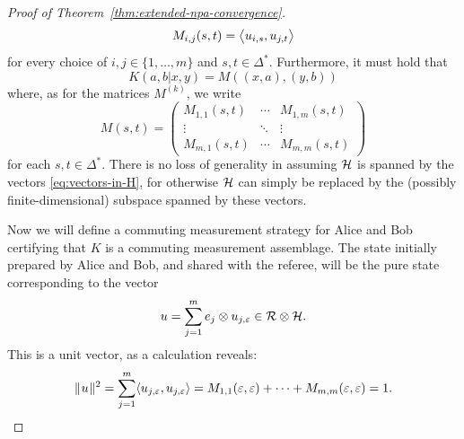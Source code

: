 \begin{proof}[Proof of Theorem~\ref{thm:extended-npa-convergence}]
  \begin{equation}
    M_{i,j}(s,t) = \bigl\langle u_{i,s}, u_{j,t} \bigr\rangle
  \end{equation}
  for every choice of $i,j\in\{1,\ldots,m\}$ and $s,t\in\Delta^{\ast}$.
  Furthermore, it must hold that
  \begin{equation}
    K(a,b|x,y) = M((x,a),(y,b))
  \end{equation}
  where, as for the matrices $M^{(k)}$, we write
  \begin{equation}
    M(s,t) = 
    \begin{pmatrix}
      M_{1,1}(s,t) & \cdots & M_{1,m}(s,t)\\
      \vdots & \ddots & \vdots\\
      M_{m,1}(s,t) & \cdots & M_{m,m}(s,t)
    \end{pmatrix}
  \end{equation}
  for each $s,t\in\Delta^{\ast}$.
  There is no loss of generality in assuming $\mathcal{H}$ is spanned by
  the vectors \eqref{eq:vectors-in-H}, for otherwise $\mathcal{H}$ can simply be replaced
  by the (possibly finite-dimensional) subspace spanned by these vectors.

  Now we will define a commuting measurement strategy for Alice and Bob
  certifying that $K$ is a commuting measurement assemblage.
  The state initially prepared by Alice and Bob, and shared with the referee,
  will be the pure state corresponding to the vector
  \begin{equation}
    u = \sum_{j = 1}^m e_j \otimes u_{j,\varepsilon} \in \mathcal{R} \otimes\mathcal{H}.
  \end{equation}
  This is a unit vector, as a calculation reveals:
  \begin{equation}
    \lVert\mspace{1mu} u \mspace{1mu}\rVert^2 = \sum_{j = 1}^m 
    \langle u_{j,\varepsilon} , u_{j,\varepsilon}\rangle
    = M_{1,1}(\varepsilon,\varepsilon) + \cdots +
    M_{m,m}(\varepsilon,\varepsilon) = 1.
  \end{equation}


\end{proof}
